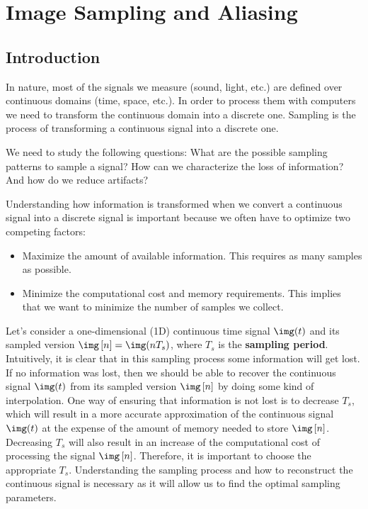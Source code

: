 
\chapter{Image Sampling and Aliasing}
\label{chapter:sampling}



\section{Introduction}

In nature, most of the signals we measure (sound, light, etc.) are defined over continuous domains (time, space, etc.). In order to process them with computers we need to transform the continuous domain into a discrete one. Sampling is the process of transforming a continuous signal into a discrete one.  

We need to study the following questions: What are the possible sampling patterns to sample a signal? How can we characterize the loss of information? And how do we reduce artifacts?

Understanding how information is transformed when we convert a continuous signal into a discrete signal is important because we often have to optimize two competing factors:
\begin{itemize}
    \item Maximize the amount of available information. This requires as many samples as possible. 
    \item Minimize the computational cost and memory requirements. This implies that we want to minimize the number of samples we collect. 
\end{itemize}

Let's consider a one-dimensional (1D) continuous time signal $\img (t)$ and its sampled version $\img \left[n \right] = \img(n T_s)$, where $T_s$ is the {\bf sampling period}. Intuitively, it is clear that in this sampling process some information will get lost. If no information was lost, then we should be able to recover the continuous signal $\img (t)$ from its sampled version $\img \left[n \right]$ by doing some kind of interpolation.  One way of ensuring that information is not lost is to decrease $T_s$, which will result in a more accurate approximation of the continuous signal $\img (t)$ at the expense of the amount of memory needed to store $\img  \left[n \right]$.  Decreasing $T_s$ will also result in an increase of the computational cost of processing the signal $\img \left[n \right]$. Therefore, it is important to choose the appropriate $T_s$. Understanding the sampling process and how to reconstruct the continuous signal is necessary as it will allow us to find the optimal sampling parameters.

